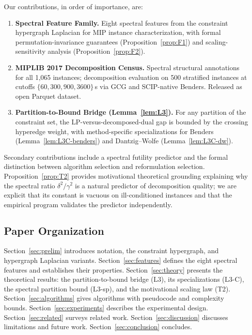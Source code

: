 \documentclass[12pt]{article}
\begin{document}
Our contributions, in order of importance, are:

\begin{enumerate}[label=\textbf{P\arabic*.},leftmargin=2em]
\item \textbf{Spectral Feature Family.}  Eight spectral features from the
  constraint hypergraph Laplacian for MIP instance characterization, with
  formal permutation-invariance guarantees (Proposition~\ref{prop:F1}) and
  scaling-sensitivity analysis (Proposition~\ref{prop:F2}).
\item \textbf{MIPLIB 2017 Decomposition Census.}  Spectral structural
  annotations for all 1,065 instances; decomposition evaluation on 500
  stratified instances at cutoffs $\{60, 300, 900, 3600\}$\,s via GCG and
  SCIP-native Benders.  Released as open Parquet dataset.
\item \textbf{Partition-to-Bound Bridge (Lemma~\ref{lem:L3}).}  For any
  partition of the constraint set, the LP-versus-decomposed-dual gap is
  bounded by the crossing hyperedge weight, with method-specific
  specializations for Benders (Lemma~\ref{lem:L3C-benders}) and
  Dantzig--Wolfe (Lemma~\ref{lem:L3C-dw}).
\end{enumerate}

\noindent
Secondary contributions include a spectral futility predictor and the
formal distinction between algorithm selection and reformulation selection.
Proposition~\ref{prop:T2} provides motivational theoretical grounding
explaining why the spectral ratio $\delta^2/\gamma^2$ is a natural
predictor of decomposition quality; we are explicit that its constant is
vacuous on ill-conditioned instances and that the empirical program validates
the predictor independently.

\subsection{Paper Organization}

Section~\ref{sec:prelim} introduces notation, the constraint hypergraph,
and hypergraph Laplacian variants.  Section~\ref{sec:features} defines the
eight spectral features and establishes their properties.
Section~\ref{sec:theory} presents the theoretical results: the
partition-to-bound bridge (L3), its specializations (L3-C), the spectral
partition bound (L3-sp), and the motivational scaling law (T2).
Section~\ref{sec:algorithms} gives algorithms with pseudocode and
complexity bounds.  Section~\ref{sec:experiments} describes the experimental
design.  Section~\ref{sec:related} surveys related work.
Section~\ref{sec:discussion} discusses limitations and future work.
Section~\ref{sec:conclusion} concludes.
\end{document}
